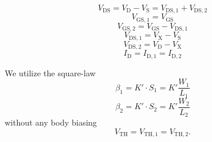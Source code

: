 \documentclass{article}[11pt]
\begin{document}
\begin{equation}
V_{\mathrm{DS}} = V_{\mathrm{D}} - V_{\mathrm{S}} = V_{\mathrm{DS,1}} + V_{\mathrm{DS,2}} 
\end{equation}
\begin{equation}
V_{\mathrm{GS,1}} = V_{\mathrm{GS}}
\end{equation}
\begin{equation}
V_{\mathrm{GS,2}} = V_{\mathrm{GS}} - V_{\mathrm{DS,1}}
\end{equation}
\begin{equation}
V_{\mathrm{DS,1}} = V_{\mathrm{X}} - V_{\mathrm{S}}
\end{equation}
\begin{equation}
V_{\mathrm{DS,2}} = V_{\mathrm{D}} - V_{\mathrm{X}}
\end{equation}
\begin{equation}
I_{\mathrm{D}} = I_{\mathrm{D,1}} = I_{\mathrm{D,2}}
\end{equation}

We utilize the square-law \cite{mosfet-square-law}
\begin{equation}
\beta_{1} = K' \cdot S_{1} = K'  \frac{W_{1}}{L_{1}}
\end{equation}
\begin{equation}
\beta_{2} = K' \cdot S_{2} = K'  \frac{W_{2}}{L_{2}}
\end{equation}
without any body biasing
\begin{equation}
V_{\mathrm{TH}} = V_{\mathrm{TH,1}} = V_{\mathrm{TH,2}}.
\end{equation}

\cite{deoliveira-vref-17,deoliveira-vref-18}


\printbibliography
\end{document}
